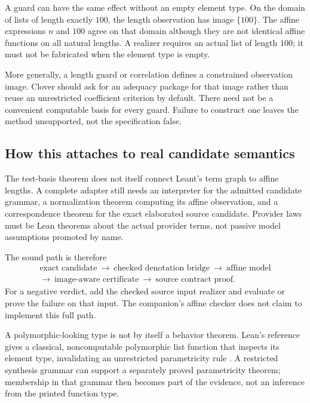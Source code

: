\documentclass[11pt,a4paper]{article}
\theoremstyle{definition}
\theoremstyle{remark}
\begin{document}
A guard can have the same effect without an empty element type. On the domain
of lists of length exactly $100$, the length observation has image $\{100\}$.
The affine expressions $n$ and $100$ agree on that domain although they are
not identical affine functions on all natural lengths. A realizer requires
an actual list of length $100$; it must not be fabricated when the element
type is empty.

More generally, a length guard or correlation defines a constrained observation
image. Clover should ask for an adequacy package for that image rather than
reuse an unrestricted coefficient criterion by default. There need not be a
convenient computable basis for every guard. Failure to construct one leaves
the method unsupported, not the specification false.

\subsection{How this attaches to real candidate semantics}

The test-basis theorem does not itself connect Leant's term graph to affine
lengths. A complete adapter still needs an interpreter for the admitted
candidate grammar, a normalization theorem computing its affine observation,
and a correspondence theorem for the exact elaborated source candidate.
Provider laws must be Lean theorems about the actual provider terms, not passive
model assumptions promoted by name.

The sound path is therefore
\[
\begin{gathered}
 \text{exact candidate}\ \longrightarrow\
 \text{checked denotation bridge}\ \longrightarrow\
 \text{affine model}\\[3pt]
 \longrightarrow\ \text{image-aware certificate}\ \longrightarrow\
 \text{source contract proof}.
\end{gathered}
\]
For a negative verdict, add the checked source input realizer and evaluate or
prove the failure on that input. The companion's affine checker does not claim
to implement this full path.

A polymorphic-looking type is not by itself a behavior theorem. Lean's
reference gives a classical, noncomputable polymorphic list function that
inspects its element type, invalidating an unrestricted parametricity rule
\cite{lean-axioms}. A restricted synthesis grammar can support a separately
proved parametricity theorem; membership in that grammar then becomes part of
the evidence, not an inference from the printed function type.
\end{document}
